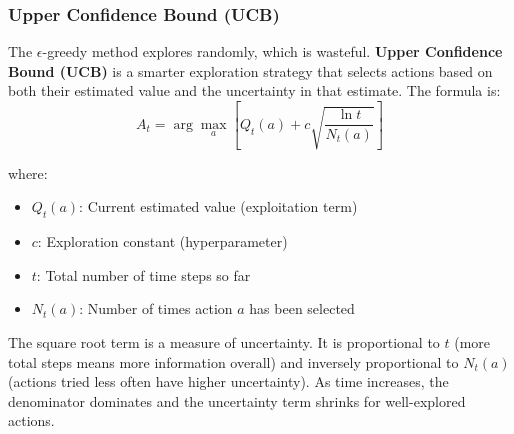 \documentclass[11pt,a4paper]{article}
\begin{document}
\subsubsection{Upper Confidence Bound (UCB)}

The $\epsilon$-greedy method explores randomly, which is wasteful. \textbf{Upper Confidence Bound (UCB)} is a smarter exploration strategy that selects actions based on both their estimated value and the uncertainty in that estimate. The formula is:
\[
A_t = \arg\max_a \left[ Q_t(a) + c \sqrt{\frac{\ln t}{N_t(a)}} \right]
\]

where:
\begin{itemize}
    \item $Q_t(a)$: Current estimated value (exploitation term)
    \item $c$: Exploration constant (hyperparameter)
    \item $t$: Total number of time steps so far
    \item $N_t(a)$: Number of times action $a$ has been selected
\end{itemize}

The square root term is a measure of uncertainty. It is proportional to $t$ (more total steps means more information overall) and inversely proportional to $N_t(a)$ (actions tried less often have higher uncertainty). As time increases, the denominator dominates and the uncertainty term shrinks for well-explored actions.
\end{document}

